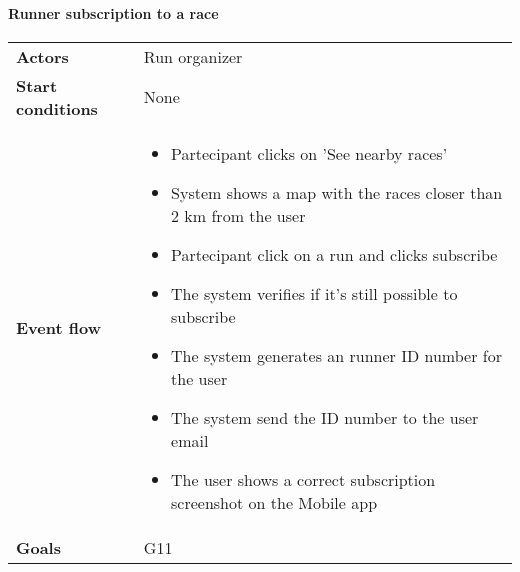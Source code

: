 \paragraph{Runner subscription to a race}
\begin{center}
\begin{table}[H]
\centering
\begin{tabular}{l|l}
\textbf{Actors} & Run organizer\\
\textbf{Start conditions} & None \\
\textbf{Event flow}  & \begin{minipage}[t]{0.7\textwidth}
    \begin{itemize}
       \item Partecipant clicks on 'See nearby races'

        \item System shows a map with the races closer than 2 km from the user

\item Partecipant click on a run and clicks subscribe
\item The system verifies if it's still possible to subscribe

\item The system generates an runner ID number for the user
\item The system send the ID number to the user email
\item The user shows a correct subscription screenshot on the Mobile app

    \end{itemize}
    \end{minipage}
    \\
\textbf{Goals} & G11
\end{tabular}

\end{table}
\end{center}

